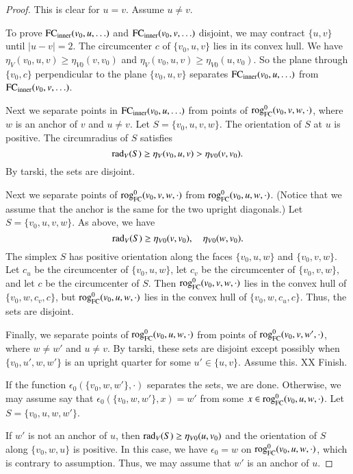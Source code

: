 \begin{proof}
This is clear for  $u=v$.  Assume $u\ne v$.  

To prove ${\operatorname{FC}}_{\text{inner}}(v_0,u,\ldots)$ and ${\operatorname{FC}}_{\text{inner}}(v_0,v,\ldots)$
disjoint, we
may contract $\{u,v\}$ until $|u-v|=2$. The circumcenter $c$ of 
$\{v_0,u,v\}$ lies
in its convex hull.  We have $\eta_V(v_0,u,v)\ge
\eta_{V0}(v,v_0)$ and $\eta_V(v_0,u,v)\ge\eta_{V0}(u,v_0)$.  So the plane
through $\{v_0,c\}$ perpendicular to the plane $\{v_0,u,v\}$ separates
${\operatorname{FC}}_{\text{inner}}(v_0,u,\ldots)$ from ${\operatorname{FC}}_{\text{inner}}(v_0,v,\ldots)$.

Next we separate points in ${\operatorname{FC}}_{\text{inner}}(v_0,u,\ldots)$ from points of
${\operatorname{rog}}^0_{\text{FC}}(v_0,v,w,\cdot)$, where $w$ is an anchor of $v$ and $u\ne v$.  Let
$S=\{v_0,u,v,w\}$. The orientation of $S$ at $u$  is
positive.  The circumradius of $S$ satisfies
    $$
    \operatorname{rad}_V(S) \ge \eta_V(v_0,u,v)>\eta_{V0}(v,v_0).
    $$
By tarski, 
the sets are disjoint.

Next we separate points of ${\operatorname{rog}}^0_{\text{FC}}(v_0,v,w,\cdot)$ from 
${\operatorname{rog}}^0_{\text{FC}}(v_0,u,w,\cdot)$.  (Notice
that we assume that the anchor is the same for the two upright diagonals.)
Let $S=\{v_0,u,v,w\}$.   As above, we have
    $$
    \operatorname{rad}_V(S) \ge \eta_{V0}(v,v_0), \quad \eta_{V0}(w,v_0).
    $$
The simplex $S$ has positive orientation along the faces
$\{v_0,u,w\}$ and $\{v_0,v,w\}$.  Let $c_u$ be the circumcenter of
$\{v_0,u,w\}$, let $c_v$ be the circumcenter of $\{v_0,v,w\}$, and let
$c$ be the circumcenter of $S$.  Then ${\operatorname{rog}}^0_{\text{FC}}(v_0,v,w,\cdot)$ lies in the
convex hull of $\{v_0,w,c_v,c\}$, but ${\operatorname{rog}}^0_{\text{FC}}(v_0,u,w,\cdot)$ lies in the convex
hull of $\{v_0,w,c_u,c\}$.  Thus, the sets are disjoint.



Finally, we separate points of ${\operatorname{rog}}^0_{\text{FC}}(v_0,u,w,\cdot)$ from points of
${\operatorname{rog}}^0_{\text{FC}}(v_0,v,w',\cdot)$,  where $w\ne w'$ and $u\ne v$. 
By tarski, these sets are disjoint except
possibly when $\{v_0,u',w,w'\}$ is an upright quarter 
for some $u'\in\{u,v\}$.  Assume this. XX Finish.

 If the function
$\epsilon_0(\{v_0,w,w'\},\cdot)$ separates the sets, we are done.
Otherwise, we may assume say that $\epsilon_0(\{v_0,w,w'\},x) = w'$
from some $x\in {\operatorname{rog}}^0_{\text{FC}}(v_0,u,w,\cdot)$.  Let $S=\{v_0,u,w,w'\}$.

If $w'$ is not an anchor of $u$, then $\operatorname{rad}_V(S) \ge\eta_{V0}(u,v_0)$
and the orientation of $S$ along $\{v_0,w,u\}$ is positive.  In this
case, we have $\epsilon_0 = w$ on ${\operatorname{rog}}^0_{\text{FC}}(v_0,u,w,\cdot)$, which is contrary
to assumption. Thus, we may assume that $w'$ is an anchor of $u$.


\end{proof}
